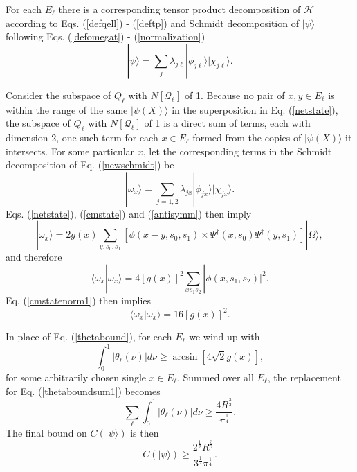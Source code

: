 \documentclass[12pt,amsmath,amssymb,onecolumn]{revtex4-2}
\begin{document}
For each $E_\ell$ there is a corresponding tensor product decomposition of $\mathcal{H}$
according to Eqs. (\ref{defqell}) - (\ref{deftp}) 
and Schmidt decomposition 
of $|\psi \rangle $ following Eqs. (\ref{defomegat}) - (\ref{normalization})
\begin{equation}
\label{newschmidt}
|\psi \rangle  = \sum_j \lambda_{j\ell} |\phi_{j\ell} \rangle |\chi_{j\ell} \rangle .
\end{equation}

Consider the subspace of $Q_\ell$ with $N[\mathcal{Q}_\ell]$ of 1. Because no pair
of $x, y \in E_\ell$ is within the range of the same $|\psi(X) \rangle $
in the superposition in Eq. (\ref{netstate}),
the subspace
of $Q_\ell$ with $N[\mathcal{Q}_\ell]$ of 1 is a direct sum of terms, each with
dimension 2, one such term
for each $x \in E_\ell$ formed from the copies of $|\psi(X) \rangle $ it intersects.
For some particular $x$, let the corresponding terms in the Schmidt decomposition
of Eq. (\ref{newschmidt}) be
\begin{equation}
\label{schmidtx}
|\omega_x \rangle  = \sum_{j = 1, 2} \lambda_{jx} |\phi_{jx} \rangle  |\chi_{jx} \rangle .
\end{equation}
Eqs. (\ref{netstate}), (\ref{cmstate}) and (\ref{antisymm}) then imply
\begin{equation}
\label{cmstate1}
|\omega_x \rangle  = 2 g(x) \sum_{y, s_0, s_1} [\phi(x -y, s_0, s_1) \times
\Psi^{\dagger}(x,s_0)\Psi^{\dagger}(y,s_1) ]  |\Omega \rangle ,
\end{equation}
and therefore
\begin{equation}
\label{omeganorm0}
 \langle \omega_x | \omega_x \rangle  = 4 [g(x)]^2 \sum_{x s_1 s_2} |\phi(x, s_1, s_2)|^2.
\end{equation}
Eq. (\ref{cmstatenorm1}) then implies
\begin{equation}
\label{omeganorm}
 \langle \omega_x | \omega_x \rangle  = 16 [g(x)]^2.
\end{equation}

In place of Eq. (\ref{thetabound}), for each $E_\ell$ we wind up with
\begin{equation}
\label{thetaboundnew}
\int_0^1 | \theta_{\ell}(\nu)| d \nu
\ge \arcsin[4\sqrt{2} g( x)],
\end{equation}
for some arbitrarily chosen single $x \in E_\ell$.
Summed over all $E_\ell$, the replacement for
Eq. (\ref{thetaboundsum1}) becomes 
\begin{equation}
\label{thetaboundsumnew}
\sum_{\ell}\int_0^1 | \theta_{\ell}(\nu)| d \nu  
\ge \frac{4R^\frac{3}{2}} {\pi^\frac{1}{4}}.
\end{equation} 
The final bound on $C(|\psi \rangle )$ is then
\begin{equation}
\label{finalboundnew}
C( |\psi \rangle ) \ge \frac{2^\frac{1}{2}R^\frac{3}{2}}{ 3^\frac{1}{2} \pi^\frac{1}{4}}.
\end{equation}
\end{document}

